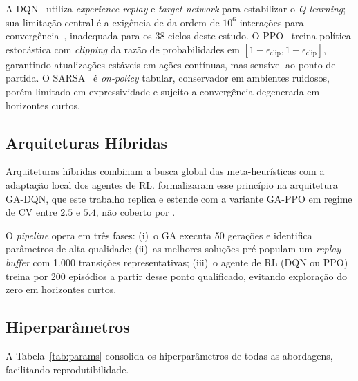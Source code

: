 \documentclass[a4paper,11pt]{article}
\begin{document}
A DQN~\citep{mnih:2015} utiliza \textit{experience replay} e
\textit{target network} para estabilizar o \textit{Q-learning};
sua limitação central é a exigência de da ordem de $10^6$ interações
para convergência~\citep{oroojlooyjadid:2022}, inadequada para os
38 ciclos deste estudo. O PPO~\citep{schulman:2017} treina política
estocástica com \textit{clipping} da razão de probabilidades em
$[1-\epsilon_\text{clip}, 1+\epsilon_\text{clip}]$, garantindo
atualizações estáveis em ações contínuas, mas sensível ao ponto de
partida. O SARSA~\citep{sutton:2018} é \textit{on-policy} tabular,
conservador em ambientes ruidosos, porém limitado em expressividade
e sujeito a convergência degenerada em horizontes curtos.

\subsection{Arquiteturas Híbridas}

Arquiteturas híbridas combinam a busca global das meta-heurísticas
com a adaptação local dos agentes de RL. \citet{zabraoui:2025}
formalizaram esse princípio na arquitetura GA-DQN, que este trabalho
replica e estende com a variante GA-PPO em regime de CV entre $2.5$
e $5.4$, não coberto por \citet{zabraoui:2025}.

O \textit{pipeline} opera em três fases: (i)~o GA executa 50
gerações e identifica parâmetros de alta qualidade;
(ii)~as melhores soluções pré-populam um \textit{replay buffer}
com 1.000 transições representativas; (iii)~o agente de RL
(DQN ou PPO) treina por 200 episódios a partir desse ponto
qualificado, evitando exploração do zero em horizontes curtos.

\subsection{Hiperparâmetros}

A Tabela~\ref{tab:params} consolida os hiperparâmetros de todas as
abordagens, facilitando reprodutibilidade.
\end{document}
